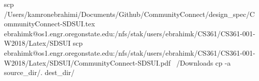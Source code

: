 scp /Users/kamronebrahimi/Documents/Github/CommunityConnect/design_spec/CommunityConnect-SDSUI.tex ebrahimk@os1.engr.oregonstate.edu:/nfs/stak/users/ebrahimk/CS361/CS361-001-W2018/Latex/SDSUI
scp ebrahimk@os1.engr.oregonstate.edu:/nfs/stak/users/ebrahimk/CS361/CS361-001-W2018/Latex/SDSUI/CommunityConnect-SDSUI.pdf ~/Downloads
cp -a source_dir/. dest_dir/
